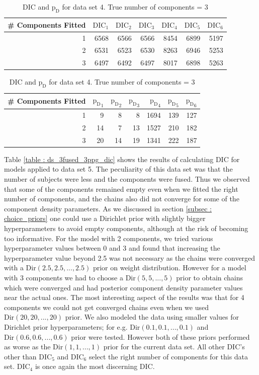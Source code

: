 \begin{table}[!htb]
\centering
\captionsetup{justification=centering}
\caption{DIC and $\text{p}_\text{D}$ for data set 4. True number of components = 3}
\label{table : ds_3fused_10ppg_dic}
\begin{tabular}{@{}rrrrrrr@{}}
\toprule
\# Components Fitted & $\text{DIC}_1$ & $\text{DIC}_2$  & $\text{DIC}_3$  & $\text{DIC}_4$  & $\text{DIC}_5$  & $\text{DIC}_6$  \\ \midrule
1 & 6568 & 6566 & 6566 & 8454 & 6899 & 5197 \\
2 & 6531 & 6523 & 6530 & 8263 & 6946 & 5253 \\
3 & 6497 & 6492 & 6497 & 8017 & 6898 & 5263 \\
\bottomrule
\end{tabular}

\begin{tabular}{@{}rrrrrrr@{}}
\toprule
\# Components Fitted & ${\text{p}_\text{D}}_1$ & ${\text{p}_\text{D}}_2$ & ${\text{p}_\text{D}}_3$ & ${\text{p}_\text{D}}_4$ & ${\text{p}_\text{D}}_5$ & ${\text{p}_\text{D}}_6$ \\ \midrule
1 & 9 & 8 & 8 & 1694 & 139 & 127 \\
2 & 14 & 7 & 13 & 1527 & 210 & 182 \\
3 & 20 & 14 & 19 & 1341 & 222 & 187 \\
\bottomrule
\end{tabular}
\end{table}

Table \ref{table : ds_3fused_3ppg_dic} shows the results of calculating DIC for models applied to data set 5. The peculiarity of this data set was that the number of subjects were less and the components were fused. Thus we observed that some of the components remained empty even when we fitted the right number of components, and the chains also did not converge for some of the component density parameters. As we discussed in section \ref{subsec : choice_priors} one could use a Dirichlet prior with slightly bigger hyperparameters to avoid empty components, although at the risk of becoming too informative. For the model with 2 components, we tried various hyperparameter values between 0 and 3 and found that increasing the hyperparameter value beyond 2.5 was not necessary as the chains were converged with a $\text{Dir}(2.5, 2.5, ..., 2.5)$ prior on weight distribution. However for a model with 3 components we had to choose a $\text{Dir}(5, 5, ..., 5)$ prior to obtain chains which were converged and had posterior component density parameter values near the actual ones. The most interesting aspect of the results was that for 4 components we could not get converged chains even when we used $\text{Dir}(20, 20, ..., 20)$ prior. We also modeled the data using smaller values for Dirichlet prior hyperparameters; for e.g. $\text{Dir}(0.1, 0.1, ..., 0.1)$ and $\text{Dir}(0.6, 0.6, ..., 0.6)$ prior were tested. However both of these priors performed as worse as the $\text{Dir}(1, 1, ..., 1)$ prior for the current data set. All other DIC's other than $\text{DIC}_5$ and $\text{DIC}_6$ select the right number of components for this data set. $\text{DIC}_4$ is once again the most discerning DIC.\\


